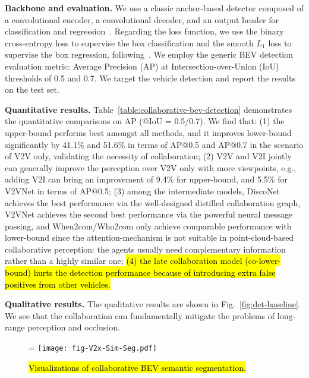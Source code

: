 \textbf{Backbone and evaluation.} We use a classic anchor-based detector composed of a convolutional encoder, a convolutional decoder, and an output header for classification and regression~\cite{Luo2018FastAF}. Regarding the loss function, we use the binary cross-entropy loss to supervise the box classification and the smooth $L_1$ loss to supervise the box regression, following~\cite{Luo2018FastAF}. We employ the generic BEV detection evaluation metric: Average Precision (AP) at Intersection-over-Union (IoU) thresholds of 0.5 and 0.7. We target the vehicle detection and report the results on the test set.

\textbf{Quantitative results.} Table~\ref{table:collaborative-bev-detection} demonstrates the quantitative comparisons on AP (@IoU = 0.5/0.7). We find that: (1) the upper-bound performs best amongst all methods, and it improves lower-bound significantly by 41.1$\%$ and 51.6$\%$ in terms of AP@0.5 and AP@0.7 in the scenario of V2V only, validating the necessity of collaboration; (2) V2V and V2I jointly can generally improve the perception over V2V only with more viewpoints, e.g., adding V2I can bring an improvement of 9.4$\%$ for upper-bound, and 5.5$\%$ for V2VNet in terms of AP@0.5; (3) among the intermediate models, DiscoNet achieves the best performance via the well-designed distilled collaboration graph, V2VNet achieves the second best performance via the powerful neural message passing, and When2com/Who2com only achieve comparable performance with lower-bound since the attention-mechanism is not suitable in point-cloud-based collaborative perception: the agents usually need complementary information rather than a highly similar one; \hl{ (4) the late collaboration model (co-lower-bound) hurts the detection performance because of introducing extra false positives from other vehicles.}

\textbf{Qualitative results.} The qualitative results are shown in Fig.~\ref{fig:det-baseline}. We see that the collaboration can fundamentally mitigate the problems of long-range perception and occlusion. 

\begin{figure*}[t]
\begin{center}
\hsize=\textwidth
\texttt{[image: fig-V2x-Sim-Seg.pdf]}
\caption{\hl{Visualizations of collaborative BEV semantic segmentation.}}
\label{fig:seg-baseline}
\end{center}
\vspace{-5mm}
\end{figure*}

